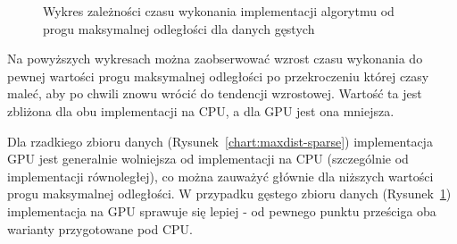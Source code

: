\documentclass[12pt]{article}
\begin{document}
\begin{figure}[H]
\caption{Wykres zależności czasu wykonania implementacji algorytmu od progu maksymalnej odległości dla danych gęstych}
\label{chart:maxdist-nonsparse}
\end{figure}

Na powyższych wykresach można zaobserwować wzrost czasu wykonania do pewnej wartości progu maksymalnej odległości po przekroczeniu której czasy maleć, aby po chwili znowu wrócić do tendencji wzrostowej. Wartość ta jest zbliżona dla obu implementacji na CPU, a dla GPU jest ona mniejsza.

Dla rzadkiego zbioru danych (Rysunek~\ref{chart:maxdist-sparse}) implementacja GPU jest generalnie wolniejsza od implementacji na CPU (szczególnie od implementacji równoległej), co można zauważyć głównie dla niższych wartości progu maksymalnej odległości. W przypadku gęstego zbioru danych (Rysunek~\ref{chart:maxdist-nonsparse}) implementacja na GPU sprawuje się lepiej - od pewnego punktu prześciga oba warianty przygotowane pod CPU.
\end{document}
